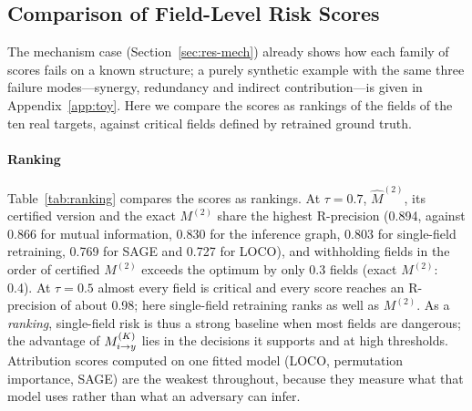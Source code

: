 \subsection{Comparison of Field-Level Risk Scores}\label{sec:res-def}

The mechanism case (Section~\ref{sec:res-mech}) already shows how each family of scores fails on a
known structure; a purely synthetic example with the same three failure modes---synergy, redundancy
and indirect contribution---is given in Appendix~\ref{app:toy}. Here we compare the scores as rankings of the
fields of the ten real targets, against critical fields defined by retrained ground truth.

\paragraph{Ranking}
Table~\ref{tab:ranking} compares the scores as rankings. At $\tau=0.7$, $\hat M^{(2)}$, its certified
version and the exact $M^{(2)}$ share the highest R-precision (0.894, against 0.866 for mutual information, 0.830 for the
inference graph, 0.803 for single-field retraining, 0.769 for SAGE and 0.727 for LOCO), and withholding fields in
the order of certified $M^{(2)}$ exceeds the optimum by only 0.3 fields (exact $M^{(2)}$: 0.4). At $\tau=0.5$
almost every field is critical and every score reaches an R-precision of about 0.98; here
single-field retraining ranks as well as $M^{(2)}$. As a \emph{ranking}, single-field risk is thus a strong
baseline when most fields are dangerous; the advantage of $M^{(K)}_{i\to y}$ lies in the decisions it supports and at high
thresholds. Attribution scores computed on one fitted
model (LOCO, permutation importance, SAGE) are the weakest throughout, because they measure what
that model uses rather than what an adversary can infer.


